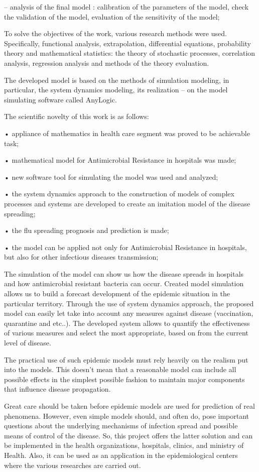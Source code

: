 –	analysis of the final model : calibration of the parameters of the model, check the validation of the model, evaluation of the sensitivity of the model;

To solve the objectives of the work, various research methods were used. Specifically, functional analysis, extrapolation, differential equations, probability theory and mathematical statistics: the theory of stochastic processes, correlation analysis, regression analysis and methods of the theory evaluation.

The developed model is based on the methods of simulation modeling, in particular, the system dynamics modeling, its realization – on the model simulating software called AnyLogic.

The scientific novelty of this work is as follows:

•	appliance of mathematics in health care segment was proved to be achievable task;

•	mathematical model for Antimicrobial Resistance in hospitals was made;

•	new software tool for simulating the model was used and analyzed;

•	the system dynamics approach to the construction of models of complex processes and systems are developed to create an imitation model of the disease spreading;

•	the flu spreading prognosis and prediction is made;

•	the model can be applied not only for Antimicrobial Resistance in hospitals, but also for other infectious diseases transmission;

The simulation of the model can show us how the disease spreads in hospitals and how antimicrobial resistant bacteria can occur. Created model simulation allows us to build a forecast development of the epidemic situation in the particular territory. Through the use of system dynamics approach, the proposed model can easily let take into account any measures against disease (vaccination, quarantine and etc..). The developed system allows to quantify the effectiveness of various measures and select the most appropriate, based on from the current level of disease.

The practical use of such epidemic models must rely heavily on the realism put into the models. This doesn't mean that a reasonable model can include all possible effects in the simplest possible fashion to maintain major components that influence disease propagation.

Great care should be taken before epidemic models are used for prediction of real phenomena. However, even simple models should, and often do, pose important questions about the underlying mechanisms of infection spread and possible means of control of the disease. So, this project offers the latter solution and can be implemented in the health organizations, hospitals, clinics, and ministry of Health. Also, it can be used as an application in the epidemiological centers where the various researches are carried out.
